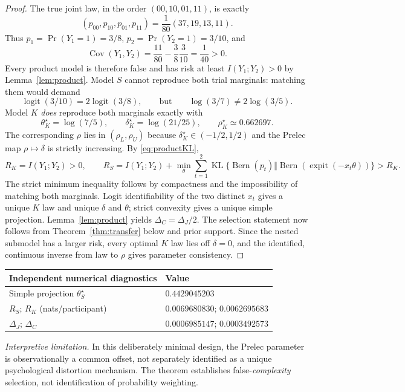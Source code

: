 \documentclass[11pt,letterpaper]{article}
\theoremstyle{plain}
\theoremstyle{definition}
\newcommand{\KL}{\operatorname{KL}}
\newcommand{\Cov}{\operatorname{Cov}}
\newcommand{\Bern}{\operatorname{Bern}}
\newcommand{\logit}{\operatorname{logit}}
\newcommand{\sig}{\operatorname{expit}}
\begin{document}
\begin{proof}
The true joint law, in the order $(00,10,01,11)$, is exactly
\begin{equation}\label{eq:exactcells}
(p_{00},p_{10},p_{01},p_{11})=\frac1{80}(37,19,13,11).
\end{equation}
Thus $p_1=\Pr(Y_1=1)=3/8$, $p_2=\Pr(Y_2=1)=3/10$, and
\[
\Cov(Y_1,Y_2)=\frac{11}{80}-\frac38\frac3{10}=\frac1{40}>0.
\]
Every product model is therefore false and has risk at least $I(Y_1;Y_2)>0$ by Lemma~\ref{lem:product}. Model $S$ cannot reproduce both trial marginals: matching them would demand
\[
\logit(3/10)=2\logit(3/8),\qquad\text{but}\qquad \log(3/7)\ne2\log(3/5).
\]
Model $K$ \emph{does} reproduce both marginals exactly with
\begin{equation}\label{eq:exactK}
\theta_K^\star=\log(7/5),\qquad \delta_K^\star=\log(21/25),\qquad \rho_K^\star\simeq0.662697.
\end{equation}
The corresponding $\rho$ lies in $(\rho_L,\rho_U)$ because $\delta_K^\star\in(-1/2,1/2)$ and the Prelec map $\rho\mapsto\delta$ is strictly increasing. By \eqref{eq:productKL},
\[
R_K=I(Y_1;Y_2)>0,\qquad
R_S=I(Y_1;Y_2)+\min_\theta\sum_{t=1}^2\KL\{\Bern(p_t)\Vert\Bern(\sig(-x_t\theta))\}>R_K.
\]
The strict minimum inequality follows by compactness and the impossibility of matching both marginals. Logit identifiability of the two distinct $x_t$ gives a unique $K$ law and unique $\delta$ and $\theta$; strict convexity gives a unique simple projection. Lemma~\ref{lem:product} yields $\Delta_C=\Delta_J/2$. The selection statement now follows from Theorem~\ref{thm:transfer} below and prior support. Since the nested submodel has a larger risk, every optimal $K$ law lies off $\delta=0$, and the identified, continuous inverse from law to $\rho$ gives parameter consistency.
\end{proof}
\begin{center}
\begin{tabular}{@{}ll@{}}\toprule
Independent numerical diagnostics & Value\\\midrule
Simple projection $\theta_S^\star$ & $0.4429045203$\\
$R_S$; $R_K$ (nats/participant) & $0.0069680830$; $0.0062695683$\\
$\Delta_J$; $\Delta_C$ & $0.0006985147$; $0.0003492573$\\
\bottomrule\end{tabular}
\end{center}
\emph{Interpretive limitation.} In this deliberately minimal design, the Prelec parameter is observationally a common offset, not separately identified as a unique psychological distortion mechanism. The theorem establishes false-\emph{complexity} selection, not identification of probability weighting.
\end{document}
